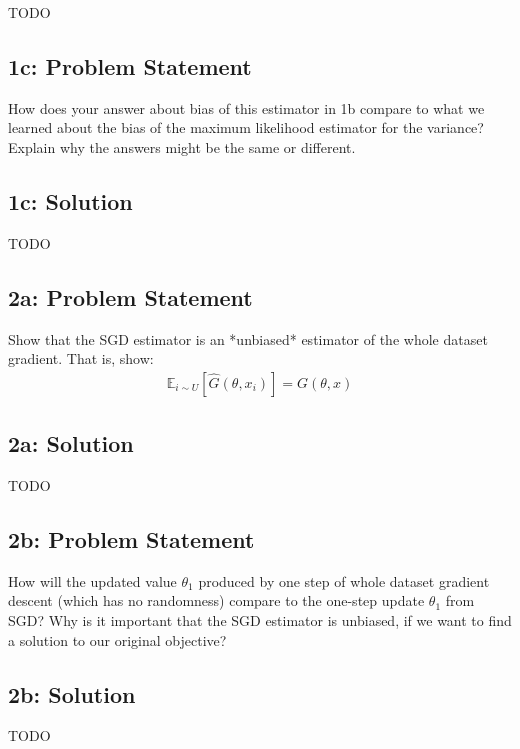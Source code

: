 \documentclass[12pt]{article}
\newcommand{\officialdirections}[1]{{\color{blue} #1}}
\begin{document}
TODO



\officialdirections{
\subsection*{1c: Problem Statement}
How does your answer about bias of this estimator in 1b compare to what we learned about the bias of the maximum likelihood estimator for the variance? Explain why the answers might be the same or different.
}

\subsection{1c: Solution}
TODO




\newpage
\officialdirections{
\subsection*{2a: Problem Statement}

Show that the SGD estimator is an *unbiased* estimator of the whole dataset gradient. That is, show:
\begin{align}
\mathbb{E}_{i \sim U}[ \hat{G}(\theta, x_i) ] = G(\theta, x)
\end{align}
}

\subsection{2a: Solution}
TODO




\newpage
\officialdirections{
\subsection*{2b: Problem Statement}
How will the updated value $\theta_1$ produced by one step of whole dataset gradient descent (which has no randomness) compare to the one-step update $\theta_1$ from SGD? Why is it important that the SGD estimator is unbiased, if we want to find a solution to our original objective?
}

\subsection{2b: Solution}
TODO






\newpage
\end{document}
